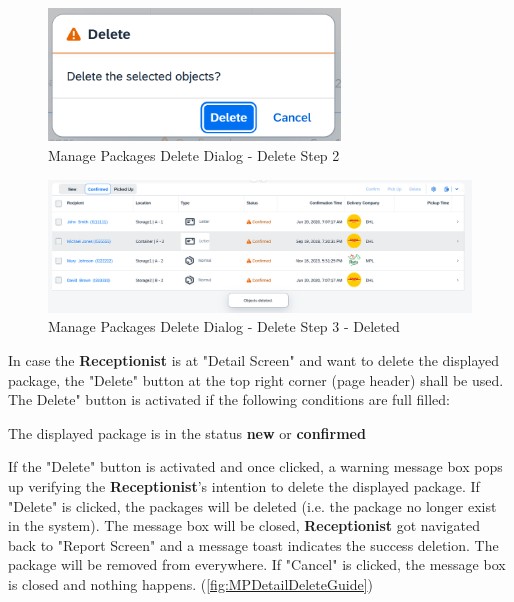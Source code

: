 \begin{figure}[H]
	\centering
	\includegraphics[height=100pt]{images/user_doc/managePack/ReportScreen/delete/deleteDlalog.png}
	\caption{Manage Packages Delete Dialog - Delete Step 2}
	\label{fig:MPReportDeleteDlg}
\end{figure}

\begin{figure}[H]
	\centering
	\includegraphics[height=100pt]{images/user_doc/managePack/ReportScreen/delete/deleteToast.png}
	\caption{Manage Packages Delete Dialog - Delete Step 3 - Deleted}
	\label{fig:MPReportDeleteDone}
\end{figure}


\bigskip
In case the \textbf{Receptionist} is at "Detail Screen" and want to delete the displayed package, the "Delete" button at the top right corner (page header) shall be used. 
The Delete" button is activated if the following conditions are full filled:

\begin{compactenum}
    \item The displayed package is in the status \textbf{new} or \textbf{confirmed}
\end{compactenum}

\bigskip
If the "Delete" button is activated and once clicked, a warning message box pops up verifying the \textbf{Receptionist}'s intention to delete the displayed package. If "Delete" is clicked, the packages will be deleted (i.e. the package no longer exist in the system). The message box will be closed, \textbf{Receptionist} got navigated back to "Report Screen" and a message toast indicates the success deletion. The package will be removed from everywhere. If "Cancel" is clicked, the message box is closed and nothing happens. (\autoref{fig:MPDetailDeleteGuide})

